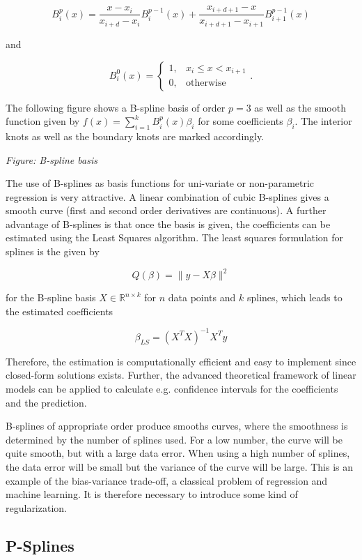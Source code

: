 \documentclass[10pt,a4paper]{article}
\begin{document}
$$B_i^p(x) = \frac{x - x_i}{x_{i+d} - x_i} B_i^{p-1}(x) + \frac{x_{i+d+1} - x}{x_{i+d+1} - x_{i+1}} B_{i+1}^{p-1}(x)$$

and

$$B_i^0(x) = \begin{cases} 1, & x_i \le x < x_{i+1} \\ 0, & \text{otherwise} \end{cases}.$$

The following figure shows a B-spline basis of order $p=3$ as well as the smooth function given by $f(x) = \sum_{i=1}^k B_i^p(x) \beta_i$ for some coefficients $\beta_i$. The interior knots as well as the boundary knots are marked accordingly. 

\emph{Figure: B-spline basis}

The use of B-splines as basis functions for uni-variate or non-parametric regression is very attractive. A linear combination of cubic B-splines gives a smooth curve (first and second order derivatives are continuous). A further advantage of B-splines is that once the basis is given, the coefficients can be estimated using the Least Squares algorithm. The least squares formulation for splines is the given by

$$Q(\beta) = \lVert y - X\beta\rVert^2$$

for the B-spline basis $X \in \mathbb{R}^{n \times k}$ for $n$ data points and $k$ splines, which leads to the estimated coefficients 

$$\beta_{LS} = (X^TX)^{-1}X^T y$$

Therefore, the estimation is computationally efficient and easy to implement since closed-form solutions exists. Further, the advanced theoretical framework of linear models can be applied to calculate e.g. confidence intervals for the coefficients and the prediction.

B-splines of appropriate order  produce smooths curves, where the smoothness is determined by the number of splines used. For a low number, the curve will be quite smooth, but with a large data error. When using a high number of splines, the data error will be small but the variance of the curve will be large. This is an example of the bias-variance trade-off, a classical problem of regression and machine learning. It is therefore necessary to introduce some kind of regularization.  

\subsection{P-Splines} \label{SubsectionPspline}
\end{document}
